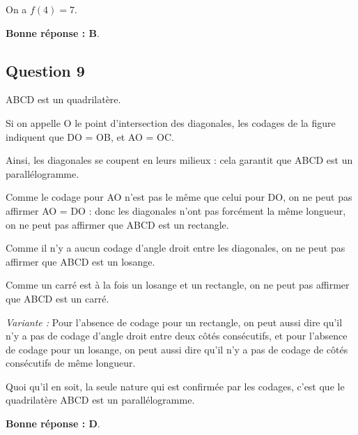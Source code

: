 	On a $f(4) = 7$.

	\textbf{Bonne réponse : B}.

\subsection*{Question 9}
	ABCD est un quadrilatère.

	Si on appelle O le point d'intersection des diagonales, les codages de la figure indiquent que DO = OB, et AO = OC.

	Ainsi, les diagonales se coupent en leurs milieux : cela garantit que ABCD est un parallélogramme.

	Comme le codage pour AO n'est pas le même que celui pour DO, on ne peut pas affirmer AO = DO : donc les diagonales n'ont pas forcément la même longueur, on ne peut pas affirmer que ABCD est un rectangle.

	Comme il n'y a aucun codage d'angle droit entre les diagonales, on ne peut pas affirmer que ABCD est un losange.

	Comme un carré est à la fois un losange et un rectangle, on ne peut pas affirmer que ABCD est un carré.

	\emph{Variante :} Pour l'absence de codage pour un rectangle, on peut aussi dire qu'il n'y a pas de codage d'angle droit entre deux côtés consécutifs, et pour l'absence de codage pour un losange, on peut aussi dire qu'il n'y a pas de codage de côtés consécutifs de même longueur.

	\medskip

	Quoi qu'il en soit, la seule nature qui est confirmée par les codages, c'est que le quadrilatère ABCD est un parallélogramme.

	\textbf{Bonne réponse : D}.

